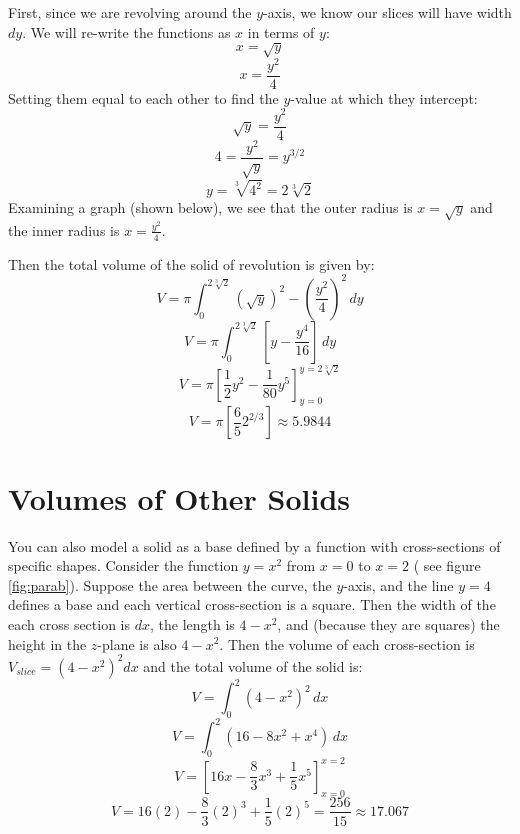 \begin{Answer}[ref = volume 2]
First, since we are revolving around the $y$-axis, we know our slices will 
have width $dy$. We will re-write the functions as $x$ in terms of $y$:
$$x = \sqrt{y}$$
$$x = \frac{y^2}{4}$$
Setting them equal to each other to find the $y$-value at which they intercept:
$$\sqrt{y} = \frac{y^2}{4}$$
$$4 = \frac{y^2}{\sqrt{y}} = y^{3/2}$$
$$y = \sqrt[3]{4^2} = 2\sqrt[3]{2}$$
Examining a graph (shown below), we see that the outer radius is $x = \sqrt{y}$
and the inner radius is $x = \frac{y^2}{4}$. 


Then the total volume of the solid of revolution is given by:
$$V = \pi \int_0^{2\sqrt[3]{2}} \left(\sqrt{y} \right)^2 - \left( \frac{y^2}{4} 
\right)^2\,dy$$
$$V = \pi \int_0^{2\sqrt[3]{2}} \left[ y - \frac{y^4}{16} \right]\,dy$$
$$V = \pi \left[ \frac{1}{2}y^2 - \frac{1}{80}y^5 \right]_{y = 0}^{y = 
2\sqrt[3]{2}}$$
$$V = \pi \left[ \frac{6}{5} 2^{2/3} \right] \approx 5.9844$$
\end{Answer}

\section{Volumes of Other Solids}
You can also model a solid as a base defined by a function with cross-sections 
of specific shapes. Consider the function $y = x^2$ from $x = 0$ to $x = 2$ (
see figure \ref{fig:parab}). Suppose the area between the curve, the $y$-axis, 
and the line $y = 4$ defines a base and each vertical cross-section is a 
square. Then the width of the each cross section is $dx$, the length is $4 - 
x^2$, and (because they are squares) the height in the $z$-plane is also $4 - 
x^2$. Then the volume of each cross-section is $V_{slice} = \left(4 - x^2 
\right)^2 dx$ and the total volume of the solid is:
$$V = \int_0^2 \left(4 - x^2 \right) ^ 2\,dx$$
$$V = \int_0^2 \left( 16 - 8x^2 + x^4 \right)\,dx$$
$$V = \left[16x - \frac{8}{3}x^3 + \frac{1}{5}x^5 \right]_{x = 0}^{x = 2}$$
$$V = 16(2) - \frac{8}{3}(2)^3 + \frac{1}{5}(2)^5 = \frac{256}{15} 
\approx 17.067$$

